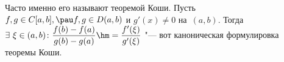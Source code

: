 
    Часто именно его называют теоремой Коши. Пусть $f,g\in C[a,b],\pau f,g\in D(a,b)$ и $g'(x)\neq0$ на~$(a,b)$. Тогда
    $\exists\  \xi\in(a,b)\colon\dfrac{f(b)-f(a)}{g(b)-g(a)}\hm=\dfrac{f'(\xi)}{g'(\xi)}$ "--- вот каноническая формулировка теоремы Коши.
